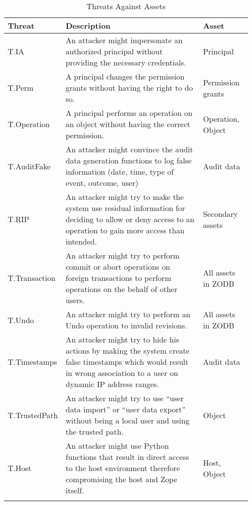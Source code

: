 \documentclass[12pt,english]{scrbook}
\begin{document}
\begin{longtable}[c]{lp{6cm}p{4cm}}
  \toprule
  Threat & Description & Asset\\
  \midrule\endhead

  T.IA
   & 
  An attacker might impersonate an authorized
  principal without providing the necessary
  credentials.
   & 
  Principal
   \\
  

  T.Perm
   & 
  A principal changes the permission grants
  without having the right to do so.
   & 
  Permission grants
   \\
  

  T.Operation
   & 
  A principal performs an operation on an object
  without having the correct permission.
   & 
  Operation, Object
   \\
  

  T.AuditFake
   & 
  An attacker might convince the audit data
  generation functions to log false information
  (date, time, type of event, outcome, user)
   & 
  Audit data
   \\
  

  T.RIP
   & 
  An attacker might try to make the system use
  residual information for deciding to allow
  or deny access to an operation to gain more
  access than intended.
   & 
  Secondary assets
   \\
  

  T.Transaction
   & 
  An attacker might try to perform commit or
  abort operations on foreign transactions to
  perform operations on the behalf of other
  users.
   & 
  All assets in ZODB
   \\
  

  T.Undo
   & 
  An attacker might try to perform an Undo
  operation to invalid revisions.
   & 
  All assets in ZODB
   \\
  

  T.Timestamps
   & 
  An attacker might try to hide his actions
  by making the system create false timestamps
  which would result in wrong association to a
  user on dynamic IP address ranges.
   & 
  Audit data
   \\
  

  T.TrustedPath
   & 
  An attacker might try to use ``user data import''
  or ``user data export'' without being a local
  user and using the trusted path.
   & 
  Object
   \\
  

  T.Host
   & 
  An attacker might use Python functions that
  result in direct access to the host environment
  therefore compromising the host and Zope itself.
   & 
  Host, Object
  \\
  \bottomrule
\caption{Threats Against Assets}
\label{tab-threats}
\end{longtable}
  
\end{document}
